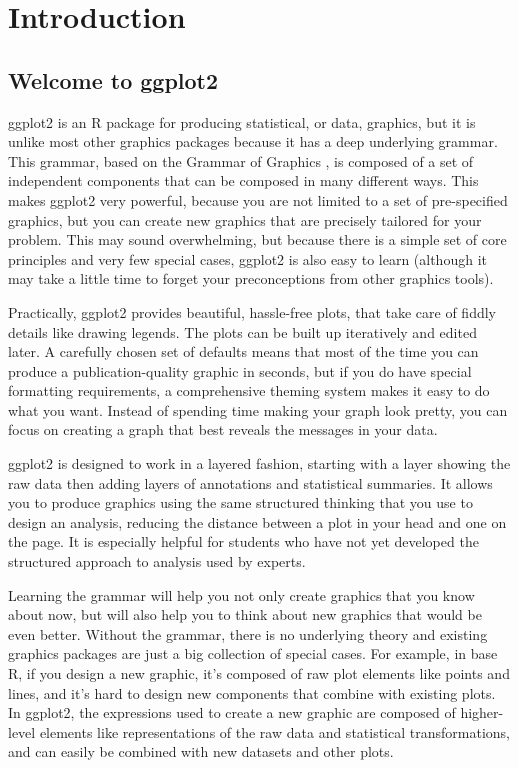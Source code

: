 

\chapter{Introduction}

\section{Welcome to ggplot2}

ggplot2 is an R package for producing statistical, or data, graphics, but it is unlike most other graphics packages because it has a deep underlying grammar. This grammar, based on the Grammar of Graphics \citep{wilkinson:2006}, is composed of a set of independent components that can be composed in many different ways.  This makes ggplot2 very powerful, because you are not limited to a set of pre-specified graphics, but you can create new graphics that are precisely tailored for your problem. This may sound overwhelming, but because there is a simple set of core principles and very few special cases, ggplot2 is also easy to learn (although it may take a little time to forget your preconceptions from other graphics tools).

Practically, ggplot2 provides beautiful, hassle-free plots, that take care of fiddly details like drawing legends.  The plots can be built up iteratively and edited later.  A carefully chosen set of defaults means that most of the time you can produce a publication-quality graphic in seconds, but if you do have special formatting requirements, a comprehensive theming system makes it easy to do what you want. Instead of spending time making your graph look pretty, you can focus on creating a graph that best reveals the messages in your data.

ggplot2 is designed to work in a layered fashion, starting with a layer showing the raw data then adding layers of annotations and statistical summaries.  It allows you to produce graphics using the same structured thinking that you use to design an analysis, reducing the distance between a plot in your head and one on the page.  It is especially helpful for students who have not yet developed the structured approach to analysis used by experts.  

Learning the grammar will help you not only create graphics that you know about now, but will also help you to think about new graphics that would be even better.  Without the grammar, there is no underlying theory and existing graphics packages are just a big collection of special cases. For example, in base R, if you design a new graphic, it's composed of raw plot elements like points and lines, and it's hard to design new components that combine with existing plots.  In ggplot2, the expressions used to create a new graphic are composed of higher-level elements like representations of the raw data and statistical transformations, and can easily be combined with new datasets and other plots.

